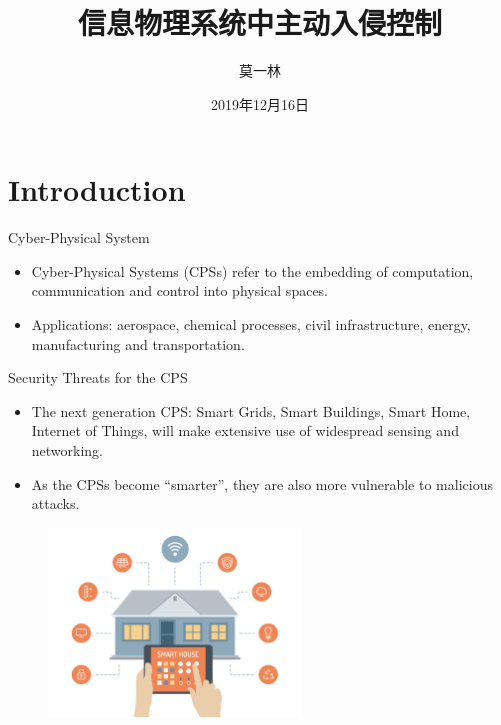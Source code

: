 \documentclass[10pt]{beamer}
\title[Secure CPS]{信息物理系统中主动入侵控制}
\author[Yilin Mo]{莫一林}
\institute[Tsinghua]{清华大学    自动化系}
\date[Dec 16th, 2019]{2019年12月16日}
\begin{document}
\maketitle 

\section{Introduction}

\begin{frame}{Cyber-Physical System}
  \begin{itemize}
  \item Cyber-Physical Systems (CPSs) refer to the embedding of computation, communication and control into physical spaces.
    \begin{center}
    \end{center}
  \item Applications: aerospace, chemical processes, civil infrastructure, energy, manufacturing and transportation. 
  \end{itemize}
\end{frame}

\begin{frame}{Security Threats for the CPS}
  \begin{itemize}
  \item The next generation CPS: Smart Grids, Smart Buildings, Smart Home, Internet of Things, will make extensive use of widespread sensing and networking.
  \item As the CPSs become ``smarter'', they are also more vulnerable to malicious attacks.
  \end{itemize}
  \begin{figure}[ht]
    \centering
    \includegraphics[width=0.6\textwidth]{SmartHome.jpg}
  \end{figure}
\end{frame}
\end{document}
